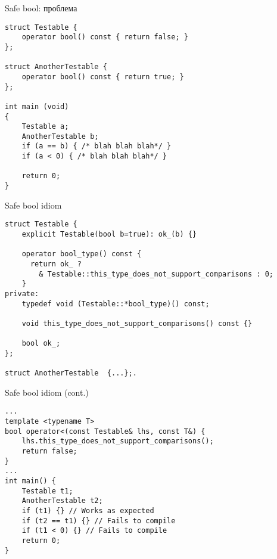 \documentclass{beamer}
\begin{document}
\begin{frame}[fragile]{Safe bool: проблема}{}
    \begin{lstlisting}
struct Testable { 
    operator bool() const { return false; }
};

struct AnotherTestable {
    operator bool() const { return true; }
};

int main (void)
{
    Testable a;
    AnotherTestable b;
    if (a == b) { /* blah blah blah*/ }
    if (a < 0) { /* blah blah blah*/ }

    return 0;
}
    \end{lstlisting}
\end{frame}

\begin{frame}[fragile]{Safe bool idiom}
    \begin{lstlisting}
struct Testable {
    explicit Testable(bool b=true): ok_(b) {}
 
    operator bool_type() const {
      return ok_ ? 
        & Testable::this_type_does_not_support_comparisons : 0;
    }
private:
    typedef void (Testable::*bool_type)() const;
    
    void this_type_does_not_support_comparisons() const {}

    bool ok_;
};

struct AnotherTestable  {...};.
    \end{lstlisting}

\end{frame}

\begin{frame}[fragile]{Safe bool idiom (cont.)}
    \begin{lstlisting}
...
template <typename T>
bool operator<(const Testable& lhs, const T&) {
    lhs.this_type_does_not_support_comparisons();
    return false;
}
...
int main() {
    Testable t1;
    AnotherTestable t2;
    if (t1) {} // Works as expected
    if (t2 == t1) {} // Fails to compile
    if (t1 < 0) {} // Fails to compile
    return 0;
} 
    \end{lstlisting}
\end{frame}
\end{document}

